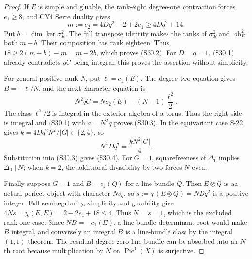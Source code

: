 \documentclass[11pt,a4paper]{article}
\theoremstyle{definition}
\begin{document}
\begin{proof}
If $E$ is simple and gluable, the rank-eight degree-one
contraction forces $e_1\ge8$, and CY4 Serre duality gives
\[
 m:=e_2=4Dq^2-2+2e_1\ge4Dq^2+14.
\]
Put $b=\dim\ker\sigma_E^2$. The full transpose identity
makes the ranks of $\sigma_E^2$ and
$\operatorname{ob}_E^2$ both $m-b$. Their composition has
rank eighteen. Thus
$18\ge2(m-b)-m=m-2b$, which proves (S30.2).
For $D=q=1$, (S30.1) already contradicts $qC$ being
integral; this proves the assertion without simplicity.

For general positive rank $N$, put $\ell=c_1(E)$.
The degree-two equation gives $B=-\ell/N$, and the
next character equation is
\[
 N^2qC=Nc_2(E)-(N-1)\frac{\ell^2}{2}.
 \tag{S30.8}
\]
The class $\ell^2/2$ is integral in the exterior algebra
of a torus. Thus the right side is integral and (S30.1)
with $a=N^2q$ proves (S30.3). In the equivariant case
S-22 gives $k=4Dq^2N^2/|G|\in\{2,4\}$, so
\[
 N^4Dq^2=\frac{kN^2|G|}{4}.
\]
Substitution into (S30.3) gives (S30.4).
For $G=1$, squarefreeness of $\Delta_0$ implies
$\Delta_0\mid N$; when $k=2$, the additional divisibility
by two forces $N$ even.

Finally suppose $G=1$ and $B=c_1(Q)$ for a line bundle
$Q$. Then $E\otimes Q$ is an actual perfect object with
character $Nv_q$, so $s:=\chi(E\otimes Q)=NDq^2$ is a
positive integer. Full semiregularity, simplicity and
gluability give
$4Ns=\chi(E,E)=2-2e_1+18\le4$.
Thus $N=s=1$, which is the excluded rank-one case.
Since $NB=-c_1(E)$, a line-bundle determinant root would
make $B$ integral, and conversely an integral $B$ is a
line-bundle class by the integral $(1,1)$ theorem.
The residual degree-zero line bundle can be absorbed
into an $N$th root because multiplication by $N$ on
$\operatorname{Pic}^0(X)$ is surjective.
\end{proof}
\end{document}
